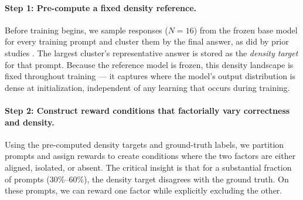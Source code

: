 \documentclass{article}
\begin{document}
\paragraph{Step 1: Pre-compute a fixed density reference.} Before training begins, we sample responses ($N=16$) from the frozen base model for every training prompt and cluster them by the final answer, as did by prior studies \cite{zuottrl,zhangright}. The largest cluster's representative answer is stored as the \textit{density target} for that prompt. Because the reference model is frozen, this density landscape is fixed throughout training --- it captures where the model's output distribution is dense at initialization, independent of any learning that occurs during training.

\paragraph{Step 2: Construct reward conditions that factorially vary correctness and density.} Using the pre-computed density targets and ground-truth labels, we partition prompts and assign rewards to create conditions where the two factors are either aligned, isolated, or absent. The critical insight is that for a substantial fraction of prompts (30\%--60\%), the density target disagrees with the ground truth. On these prompts, we can reward one factor while explicitly excluding the other.
\end{document}
